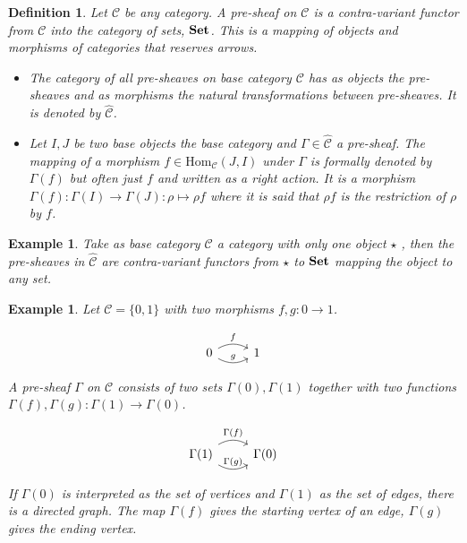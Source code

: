 \documentclass[12pt,a4paper,twoside,xetex]{book} %
\newcommand{\keyword}[1]{\emph{#1}\index{#1}}
\newtheorem{definition}[theorem]{Definition}
\newtheorem{example}[theorem]{Example}
\newcommand{\psh}[1]{\widehat{#1}}
\begin{document}
\begin{definition}
Let $\mathcal{C}$ be any category. A \keyword{pre-sheaf} on $\mathcal{C}$ is a 
contra-variant functor from $\mathcal{C}$ into the category of sets, $\text{\textbf{Set}}$. 
This is a mapping of objects and morphisms of categories that reserves arrows. 

\begin{itemize}
\item The category of all pre-sheaves on base category $\mathcal{C}$ has as 
objects the pre-sheaves and as morphisms the natural transformations between 
pre-sheaves. It is denoted by $\psh{\mathcal{C}}$.

\item Let $I,J$ be two base objects the base category and $\Gamma \in 
\psh{\mathcal{C}}$ a pre-sheaf. 
The mapping of a morphism $f \in \text{Hom}_{\mathcal{C}} (J,I)$ under $\Gamma$ 
is formally denoted by $\Gamma (f)$ but often just $f$ and written as a right 
action. 
It is a morphism $\Gamma (f) : \Gamma(I) \rightarrow \Gamma (J):\rho \mapsto 
\rho f$ where it is said that $\rho f$ is the \keyword{restriction} of $\rho$ by 
$f$.

\end{itemize}
\end{definition}

\begin{example}
Take as base category $\mathcal{C}$ a category with only one object 
$\star$ , then the pre-sheaves in $\psh{\mathcal{C}}$ are contra-variant functors 
from $\star$ to $\text{\textbf{Set}}$ mapping the object to any set. 

\end{example}

\begin{example}

Let $\mathcal{C} = \{0,1\}$ with two morphisms $f,g:0\rightarrow 1$. 

\[ \begin{tikzcd}
0 \arrow[r, bend left, "f"] \arrow[r, bend right, "g"] & 1
\end{tikzcd} \]


A pre-sheaf $\Gamma$ on $\mathcal{C}$ consists of two sets $\Gamma (0), \Gamma 
(1)$ together with two functions $\Gamma (f),\Gamma (g):\Gamma (1) \rightarrow 
\Gamma (0)$.

\[ \begin{tikzcd}
\Gamma (1)
\arrow[r, bend left, "\Gamma (f)"] 
\arrow[r, bend right, "\Gamma (g)"] 
& \Gamma(0) 
\end{tikzcd} \]

 If $\Gamma (0)$ is interpreted as the set of vertices and $\Gamma (1)$ as the 
set of edges, there is a directed graph. The map $\Gamma (f)$ gives the starting 
vertex of an edge, $\Gamma (g)$ gives the ending vertex. 
\end{example}
\end{document}

